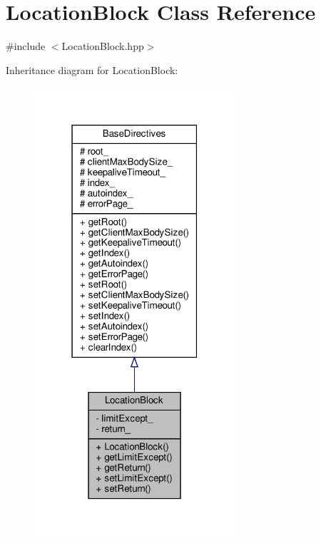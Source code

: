 \hypertarget{classft_1_1_location_block}{}\section{Location\+Block Class Reference}
\label{classft_1_1_location_block}


{\ttfamily \#include $<$Location\+Block.\+hpp$>$}



Inheritance diagram for Location\+Block\+:
\nopagebreak
\begin{figure}[H]
\begin{center}
\leavevmode
\includegraphics[width=211pt]{classft_1_1_location_block__inherit__graph}
\end{center}
\end{figure}


